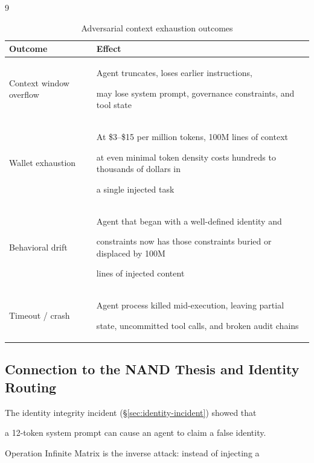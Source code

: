 \documentclass[11pt]{article}
\theoremstyle{definition}
\begin{document}
\begin{thebibliography}{9}
\begin{table}[h]

\centering

\caption{Adversarial context exhaustion outcomes}

\begin{tabular}{p{3cm}p{9cm}}

\toprule

\textbf{Outcome} & \textbf{Effect} \\

\midrule

Context window overflow & Agent truncates, loses earlier instructions,

  may lose system prompt, governance constraints, and tool state \\

Wallet exhaustion & At \$3--\$15 per million tokens, 100M lines of context

  at even minimal token density costs hundreds to thousands of dollars in

  a single injected task \\

Behavioral drift & Agent that began with a well-defined identity and

  constraints now has those constraints buried or displaced by 100M

  lines of injected content \\

Timeout / crash & Agent process killed mid-execution, leaving partial

  state, uncommitted tool calls, and broken audit chains \\

\bottomrule

\end{tabular}

\end{table}



\subsection{Connection to the NAND Thesis and Identity Routing}



The identity integrity incident (\S\ref{sec:identity-incident}) showed that

a 12-token system prompt can cause an agent to claim a false identity.

Operation Infinite Matrix is the inverse attack: instead of injecting a


\end{thebibliography}
\end{document}
